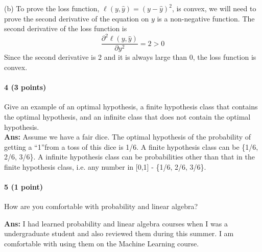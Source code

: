 \documentclass[11pt]{article}
\begin{document}
\noindent
(b) To prove the loss function, $\ell (y, \hat{y}) = (y-\hat{y})^2$, is convex, we will need to prove the second derivative of the equation on $y$ is a non-negative function. 
The second derivative of the loss function is 
$$\frac{\partial^2 \ell(y, \hat{y})}{\partial y^2} = 2 > 0$$
Since the second derivative is 2 and it is always large than 0, the loss function is convex.




\paragraph{4 (3 points)} 
Give an example of an optimal hypothesis, a finite hypothesis class that contains the optimal hypothesis, and an infinite class that does not contain the optimal hypothesis.\\
\noindent
\textbf{Ans:} Assume we have a fair dice. The optimal hypothesis of the probability of getting a \textquotedblleft1\textquotedblright from a toss of this dice is 1/6. A finite hypothesis class can be \{1/6, 2/6, 3/6\}. A infinite hypothesis class can be probabilities other than that in the finite hypothesis class, i.e. any number in [0,1] - \{1/6, 2/6, 3/6\}.

\paragraph{5 (1 point)}
How are you comfortable with probability and linear algebra?

\noindent
\textbf{Ans:}
I had learned probability and linear algebra courses when I was a undergraduate student and also reviewed them during this summer. I am comfortable with using them on the Machine Learning course.
\end{document}
